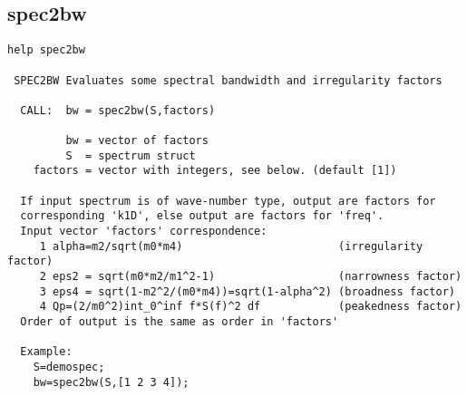 \newpage
\subsection{spec2bw}
{\small\begin{verbatim}
help spec2bw

 SPEC2BW Evaluates some spectral bandwidth and irregularity factors

  CALL:  bw = spec2bw(S,factors)

         bw = vector of factors
         S  = spectrum struct
    factors = vector with integers, see below. (default [1])

  If input spectrum is of wave-number type, output are factors for
  corresponding 'k1D', else output are factors for 'freq'.
  Input vector 'factors' correspondence:
     1 alpha=m2/sqrt(m0*m4)                        (irregularity factor)
     2 eps2 = sqrt(m0*m2/m1^2-1)                   (narrowness factor)
     3 eps4 = sqrt(1-m2^2/(m0*m4))=sqrt(1-alpha^2) (broadness factor)
     4 Qp=(2/m0^2)int_0^inf f*S(f)^2 df            (peakedness factor)
  Order of output is the same as order in 'factors'

  Example:
    S=demospec;
    bw=spec2bw(S,[1 2 3 4]);
\end{verbatim}} 

\newpage
